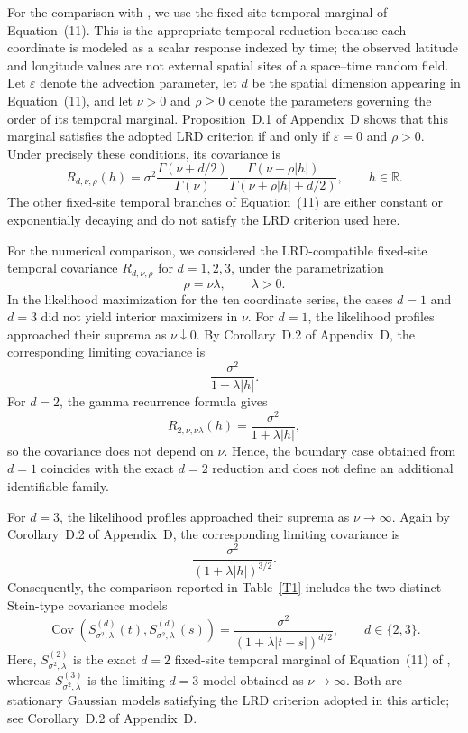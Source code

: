 \documentclass[preprint,12pt,authoryear]{elsarticle}
\begin{document}
For the comparison with \citet{Stein2005}, we use the fixed-site temporal
marginal of Equation~(11). This is the appropriate temporal reduction
because each coordinate is modeled as a scalar response indexed by time;
the observed latitude and longitude values are not external spatial sites
of a space--time random field. Let \(\varepsilon\) denote the advection
parameter, let \(d\) be the spatial dimension appearing in Equation~(11),
and let \(\nu>0\) and \(\rho\geq0\) denote the parameters governing the
order of its temporal marginal. Proposition~D.1 of Appendix~D shows
that this marginal satisfies the adopted LRD criterion if and only if
\(\varepsilon=0\) and \(\rho>0\). Under precisely these conditions, its
covariance is
\[
R_{d,\nu,\rho}(h)
=
\sigma^2
\frac{\Gamma(\nu+d/2)}{\Gamma(\nu)}
\frac{\Gamma(\nu+\rho|h|)}
     {\Gamma(\nu+\rho|h|+d/2)},
\qquad h\in\mathbb{R}.
\]
The other fixed-site temporal branches of Equation~(11) are either
constant or exponentially decaying and do not satisfy the LRD criterion
used here.

For the numerical comparison, we considered the LRD-compatible fixed-site
temporal covariance \(R_{d,\nu,\rho}\) for \(d=1,2,3\), under the
parametrization
\[
\rho=\nu\lambda,\qquad \lambda>0.
\]
In the likelihood maximization for the ten coordinate series, the cases
\(d=1\) and \(d=3\) did not yield interior maximizers in \(\nu\). For
\(d=1\), the likelihood profiles approached their suprema as
\(\nu\downarrow0\). By Corollary~D.2 of Appendix~D, the corresponding
limiting covariance is
\[
\frac{\sigma^2}{1+\lambda|h|}.
\]
For \(d=2\), the gamma recurrence formula gives
\[
R_{2,\nu,\nu\lambda}(h)
=
\frac{\sigma^2}{1+\lambda|h|},
\]
so the covariance does not depend on \(\nu\). Hence, the boundary case
obtained from \(d=1\) coincides with the exact \(d=2\) reduction and does
not define an additional identifiable family.

For \(d=3\), the likelihood profiles approached their suprema as
\(\nu\to\infty\). Again by Corollary~D.2 of Appendix~D, the
corresponding limiting covariance is
\[
\frac{\sigma^2}{(1+\lambda|h|)^{3/2}}.
\]
Consequently, the comparison reported in Table~\ref{T1} includes the two
distinct Stein-type covariance models
\[
\operatorname{Cov}\!\left(
S_{\sigma^2,\lambda}^{(d)}(t),
S_{\sigma^2,\lambda}^{(d)}(s)
\right)
=
\frac{\sigma^2}
     {(1+\lambda|t-s|)^{d/2}},
\qquad d\in\{2,3\}.
\]
Here, \(S_{\sigma^2,\lambda}^{(2)}\) is the exact \(d=2\) fixed-site
temporal marginal of Equation~(11) of \citet{Stein2005}, whereas
\(S_{\sigma^2,\lambda}^{(3)}\) is the limiting \(d=3\) model obtained as
\(\nu\to\infty\). Both are stationary Gaussian models satisfying the LRD
criterion adopted in this article; see Corollary~D.2 of Appendix~D.
\end{document}
